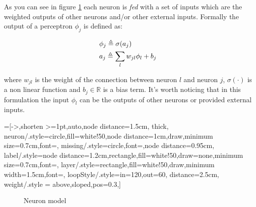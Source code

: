 As you can see in figure \ref{neuron_model} each neuron is \textit{fed} with a set of inputs which are the weighted outputs of other neurons and/or other external inputs.
Formally the output of a perceptron $\phi_j$
is defined as:
 
\begin{align}
&\phi_j \triangleq \sigma(a_j)\label{def_perceptron_1}\\
&a_j \triangleq \sum_l w_{jl}\phi_l +b_j \label{def_perceptron_2}
\end{align}

where $w_{jl}$ is the weight of the connection between neuron $l$ and neuron $j$, $\sigma(\cdot)$ is a non linear function and $b_j \in \mathbb{R}$ is a bias term.
It's worth noticing that in this formulation the input $\phi_l$ can be the outputs of other neurons or provided external inputs.


=[->,shorten >=1pt,auto,node distance=1.5cm,
  thick,
  neuron/.style={circle,fill=white!50,node distance=1cm,draw,minimum size=0.7cm,font=\sffamily\normalsize},
  missing/.style={circle,font=\sffamily\Large,node distance=0.95cm},
  label/.style={node distance=1.2cm,rectangle,fill=white!50,draw=none,minimum size=0.7cm,font=\sffamily\normalsize},
  layer/.style={rectangle,fill=white!50,draw,minimum width=1.5cm,font=\sffamily\Large},
  loopStyle/.style={in=120,out=60, distance=2.5cm},
  weight/.style = {above,sloped,pos=0.3},]
\begin{figure}[h]
 \centering
{}
\caption{Neuron model}
\label{neuron_model}
\end{figure}

